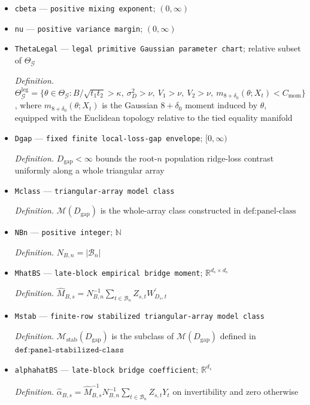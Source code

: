 \documentclass{article}
\begin{document}
\begin{itemize}
  \item \texttt{cbeta} --- \texttt{positive mixing exponent}; \((0,\infty)\)
  \item \texttt{nu} --- \texttt{positive variance margin}; \((0,\infty)\)
  \item \texttt{ThetaLegal} --- \texttt{legal primitive Gaussian parameter chart}; relative subset of \(\Theta_{\mathcal G}\)
  \par\smallskip\noindent\emph{Definition.} \(\Theta_{\mathcal G}^{\mathrm{leg}}=\{\theta\in\Theta_{\mathcal G}:B/\sqrt{t_1t_2}>\kappa,\ \sigma_D^2>\nu,\ V_1>\nu,\ V_2>\nu,\ m_{8+\delta_0}(\theta;X_t)<C_{\mathrm{mom}}\}\), where \(m_{8+\delta_0}(\theta;X_t)\) is the Gaussian \(8+\delta_0\) moment induced by \(\theta\), equipped with the Euclidean topology relative to the tied equality manifold
  \item \texttt{Dgap} --- \texttt{fixed finite local-\allowbreak{}loss-\allowbreak{}gap envelope}; \([0,\infty)\)
  \par\smallskip\noindent\emph{Definition.} \(D_{\mathrm{gap}}<\infty\) bounds the root-\(n\) population ridge-loss contrast uniformly along a whole triangular array
  \item \texttt{Mclass} --- \texttt{triangular-\allowbreak{}array model class}
  \par\smallskip\noindent\emph{Definition.} \(\mathcal M(D_{\mathrm{gap}})\) is the whole-array class constructed in \(\text{def:panel-class}\)
  \item \texttt{NBn} --- \texttt{positive integer}; \(\mathbb N\)
  \par\smallskip\noindent\emph{Definition.} \(N_{B,n}=|\mathcal B_n|\)
  \item \texttt{MhatBS} --- \texttt{late-\allowbreak{}block empirical bridge moment}; \(\mathbb R^{d_s\times d_s}\)
  \par\smallskip\noindent\emph{Definition.} \(\widehat M_{B,s}=N_{B,n}^{-1}\sum_{t\in\mathcal B_n}Z_{s,t}W_{D_s,t}^{\prime}\)
  \item \texttt{Mstab} --- \texttt{finite-\allowbreak{}row stabilized triangular-\allowbreak{}array model class}
  \par\smallskip\noindent\emph{Definition.} \(\mathcal M_{\mathrm{stab}}(D_{\mathrm{gap}})\) is the subclass of \(\mathcal M(D_{\mathrm{gap}})\) defined in \(\texttt{def:panel-stabilized-class}\)
  \item \texttt{alphahatBS} --- \texttt{late-\allowbreak{}block bridge coefficient}; \(\mathbb R^{d_s}\)
  \par\smallskip\noindent\emph{Definition.} \(\widehat\alpha_{B,s}=\widehat M_{B,s}^{-1}N_{B,n}^{-1}\sum_{t\in\mathcal B_n}Z_{s,t}Y_t\) on invertibility and zero otherwise

\end{itemize}
\end{document}
